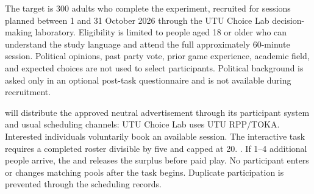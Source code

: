 


\small

The target is 300 adults who complete the experiment, recruited for sessions planned between 1 and 31 October 2026 through the UTU Choice Lab decision-making laboratory. Eligibility is limited to people aged 18 or older who can understand the study language and attend the full approximately 60-minute session. Political opinions, past party vote, prior game experience, academic field, and expected choices are not used to select participants. Political background is asked only in an optional post-task questionnaire and is not available during recruitment.

 will distribute the approved neutral advertisement through its participant system and usual scheduling channels: UTU Choice Lab uses UTU RPP/TOKA. Interested individuals voluntarily book an available session. The interactive task requires a completed roster divisible by five and capped at 20. . If 1--4 additional people arrive, the  and releases the surplus before paid play. No participant enters or changes matching pools after the task begins. Duplicate participation is prevented through the  scheduling records.


